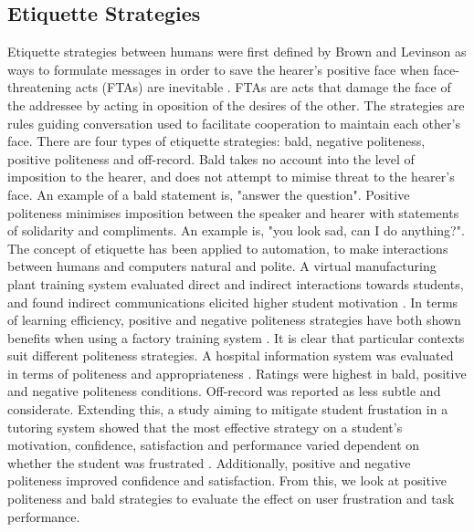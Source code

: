 \documentclass[12pt,a4paper]{article}
\begin{document}
\subsection{Etiquette Strategies}
Etiquette strategies between humans were first defined by Brown and Levinson as ways to formulate messages in order to save the hearer's positive face when face-threatening acts (FTAs) are inevitable \cite{brown1987politeness}. FTAs are acts that damage the face of the addressee by acting in oposition of the desires of the other. The strategies are rules guiding conversation used to facilitate cooperation to maintain each other's face. There are four types of etiquette strategies: bald, negative politeness, positive politeness and off-record. Bald takes no account into the level of imposition to the hearer, and does not attempt to mimise threat to the hearer's face. An example of a bald statement is, "answer the question". Positive politeness minimises imposition between the speaker and hearer with statements of solidarity and compliments. An example is, "you look sad, can I do anything?". The concept of etiquette has been applied to automation, to make interactions between humans and computers natural and polite. A virtual manufacturing plant training system evaluated direct and indirect interactions towards students, and found indirect communications elicited higher student motivation \cite{qu2005using}. In terms of learning efficiency, positive and negative politeness strategies have both shown benefits when using a factory training system \cite{johnson2010role}. It is clear that particular contexts suit different politeness strategies. A hospital information system was evaluated in terms of politeness and appropriateness \cite{bickmore2010response}. Ratings were highest in bald, positive and negative politeness conditions. Off-record was reported as less subtle and considerate. Extending this, a study aiming to mitigate student frustation in a tutoring system showed that the most effective strategy on a student's motivation, confidence, satisfaction and performance varied dependent on whether the student was frustrated \cite{yang2018evaluating}. Additionally, positive and negative politeness improved confidence and satisfaction. From this, we look at positive politeness and bald strategies to evaluate the effect on user frustration and task performance.
\end{document}
